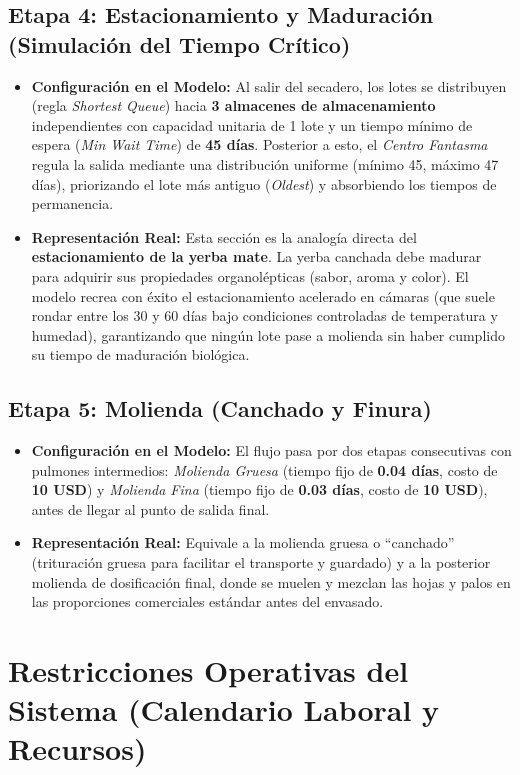\documentclass[11pt, a4paper]{article}
\begin{document}
\subsection{Etapa 4: Estacionamiento y Maduración (Simulación del Tiempo Crítico)}
\begin{itemize}
    \item \textbf{Configuración en el Modelo:} Al salir del secadero, los lotes se distribuyen (regla \textit{Shortest Queue}) hacia \textbf{3 almacenes de almacenamiento} independientes con capacidad unitaria de 1 lote y un tiempo mínimo de espera (\textit{Min Wait Time}) de \textbf{45 días}. Posterior a esto, el \textit{Centro Fantasma} regula la salida mediante una distribución uniforme (mínimo 45, máximo 47 días), priorizando el lote más antiguo (\textit{Oldest}) y absorbiendo los tiempos de permanencia.
    \item \textbf{Representación Real:} Esta sección es la analogía directa del \textbf{estacionamiento de la yerba mate}. La yerba canchada debe madurar para adquirir sus propiedades organolépticas (sabor, aroma y color). El modelo recrea con éxito el estacionamiento acelerado en cámaras (que suele rondar entre los 30 y 60 días bajo condiciones controladas de temperatura y humedad), garantizando que ningún lote pase a molienda sin haber cumplido su tiempo de maduración biológica.
\end{itemize}

\subsection{Etapa 5: Molienda (Canchado y Finura)}
\begin{itemize}
    \item \textbf{Configuración en el Modelo:} El flujo pasa por dos etapas consecutivas con pulmones intermedios: \textit{Molienda Gruesa} (tiempo fijo de \textbf{0.04 días}, costo de \textbf{10 USD}) y \textit{Molienda Fina} (tiempo fijo de \textbf{0.03 días}, costo de \textbf{10 USD}), antes de llegar al punto de salida final.
    \item \textbf{Representación Real:} Equivale a la molienda gruesa o ``canchado'' (trituración gruesa para facilitar el transporte y guardado) y a la posterior molienda de dosificación final, donde se muelen y mezclan las hojas y palos en las proporciones comerciales estándar antes del envasado.
\end{itemize}

\section{Restricciones Operativas del Sistema (Calendario Laboral y Recursos)}
\end{document}
